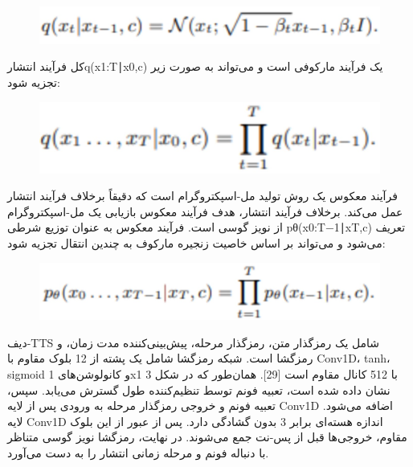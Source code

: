 \documentclass[fleqn]{report}
\begin{document}
\begin{figure}[h]

    \centering
    \includegraphics[width=.6\textwidth, keepaspectratio]{images/eq1.jpg}
    
    \label{fig:eq1}
\end{figure}

کل فرآیند انتشارq(x1:T∣x0,c)  یک فرآیند مارکوفی است و می‌تواند به صورت زیر تجزیه شود:

\begin{figure}[h]

    \centering
    \includegraphics[width=.6\textwidth, keepaspectratio]{images/eq2.jpg}
    
    \label{fig:eq2}
\end{figure}

فرآیند معکوس یک روش تولید مل-اسپکتروگرام است که دقیقاً برخلاف فرآیند انتشار عمل می‌کند. برخلاف فرآیند انتشار، هدف فرآیند معکوس بازیابی یک مل-اسپکتروگرام از نویز گوسی است. فرآیند معکوس به عنوان توزیع شرطی pθ​(x0:T−1​∣xT​,c) تعریف می‌شود و می‌تواند بر اساس خاصیت زنجیره مارکوف به چندین انتقال تجزیه شود:

\begin{figure}[h]

    \centering
    \includegraphics[width=.6\textwidth, keepaspectratio]{images/eq3.jpg}
    
    \label{fig:eq3}
\end{figure}

دیف-TTS شامل یک رمزگذار متن، رمزگذار مرحله، پیش‌بینی‌کننده مدت زمان، و رمزگشا است. 
شبکه رمزگشا شامل یک پشته از 12 بلوک مقاوم با Conv1D، tanh، sigmoid و کانولوشن‌های 1x1 با 512 کانال مقاوم است [29]. همان‌طور که در شکل 3 نشان داده شده است، تعبیه فونم توسط تنظیم‌کننده طول گسترش می‌یابد. سپس، تعبیه فونم و خروجی رمزگذار مرحله به ورودی پس از لایه Conv1D اضافه می‌شود. لایه Conv1D اندازه هسته‌ای برابر 3 بدون گشادگی دارد. پس از عبور از این بلوک مقاوم، خروجی‌ها قبل از پس-نت جمع می‌شوند. در نهایت، رمزگشا نویز گوسی متناظر با دنباله فونم و مرحله زمانی انتشار را به دست می‌آورد.
\end{document}
